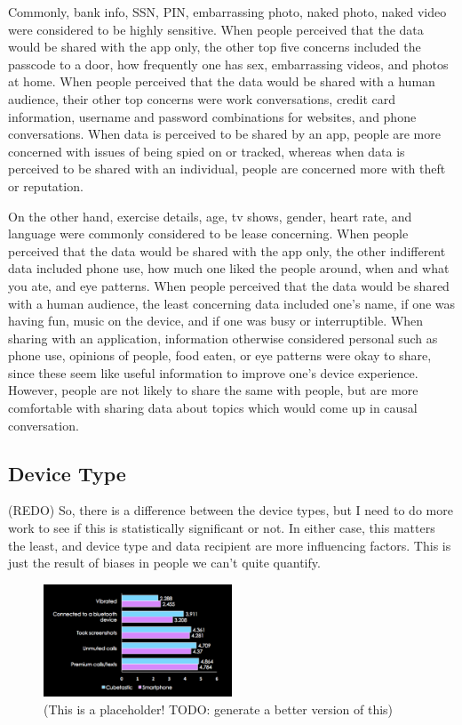 \documentclass{acm_proc_article-sp}
\begin{document}
Commonly, bank info, SSN, PIN, embarrassing photo, naked photo, naked video were considered to be highly sensitive. When people perceived that the data would be shared with the app only, the other top five concerns included the passcode to a door, how frequently one has sex, embarrassing videos, and photos at home. When people perceived that the data would be shared with a human audience, their other top concerns were work conversations, credit card information, username and password combinations for websites, and phone conversations. When data is perceived to be shared by an app, people are more concerned with issues of being spied on or tracked, whereas when data is perceived to be shared with an individual, people are concerned more with theft or reputation. 

On the other hand, exercise details, age, tv shows, gender, heart rate, and language were commonly considered to be lease concerning. When people perceived that the data would be shared with the app only, the other indifferent data included phone use, how much one liked the people around, when and what you ate, and eye patterns. When people perceived that the data would be shared with a human audience, the least concerning data included one's name, if one was having fun, music on the device, and if one was busy or interruptible. When sharing with an application, information otherwise considered personal such as phone use, opinions of people, food eaten, or eye patterns were okay to share, since these seem like useful information to improve one's device experience. However, people are not likely to share the same with people, but are more comfortable with sharing data about topics which would come up in causal conversation.

\subsection{Device Type}

(REDO) So, there is a difference between the device types, but I need to do more work to see if this is statistically significant or not. In either case, this matters the least, and device type and data recipient are more influencing factors. This is just the result of biases in people we can't quite quantify.  

\begin{figure}
	\centering
	\includegraphics[width=0.5\textwidth]{device-type.png}
	\caption{(This is a placeholder! TODO: generate a better version of this)}
\end{figure}
\end{document}
